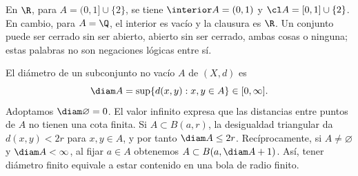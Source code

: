 \begin{ejemplo}
En $\R$, para $A=(0,1]\cup\{2\}$, se tiene $\interior A=(0,1)$ y $\cl A=[0,1]\cup\{2\}$. En cambio, para $A=\Q$, el interior es vacío y la clausura es $\R$. Un conjunto puede ser cerrado sin ser abierto, abierto sin ser cerrado, ambas cosas o ninguna; estas palabras no son negaciones lógicas entre sí.
\end{ejemplo}

\begin{definicion}[Diámetro]
El diámetro de un subconjunto no vacío $A$ de $(X,d)$ es
\[
 \diam A=\sup\{d(x,y):x,y\in A\}\in[0,\infty].
\]
Adoptamos $\diam\varnothing=0$. El valor infinito expresa que las distancias entre puntos de $A$ no tienen una cota finita. Si $A\subset B(a,r)$, la desigualdad triangular da $d(x,y)<2r$ para $x,y\in A$, y por tanto $\diam A\le2r$. Recíprocamente, si $A\ne\varnothing$ y $\diam A<\infty$, al fijar $a\in A$ obtenemos $A\subset B(a,\diam A+1)$. Así, tener diámetro finito equivale a estar contenido en una bola de radio finito.
\end{definicion}

